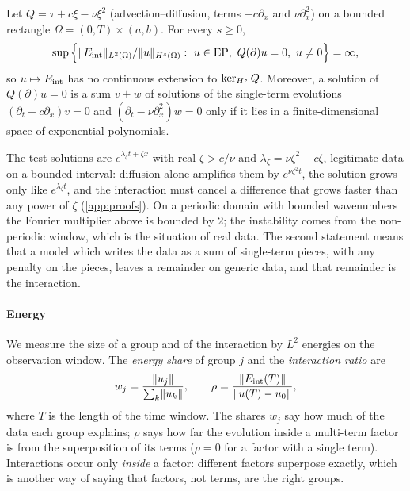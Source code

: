 \begin{proposition}\label{prop:discont}\label{thm:noreg}\label{thm:nocont}
Let $Q=\tau+c\xi-\nu\xi^2$ (advection--diffusion, terms $-c\partial_x$ and $\nu\partial_x^2$) on a bounded
rectangle $\Omega=(0,T)\times(a,b)$. For every $s\ge0$,
\[
  \sup\Big\{\norm{\Eint}_{L^2(\Omega)}/\norm{u}_{\Hs(\Omega)}:\ u\in\EP,\ Q(\partial)u=0,\ u\ne0\Big\}=\infty,
\]
so $u\mapsto E_{\mathrm{int}}$ has no continuous extension to $\ker_{H^{s}}Q$. Moreover, a solution of $Q(\partial)u=0$ is a
sum $v+w$ of solutions of the single-term evolutions $(\partial_t+c\partial_x)v=0$ and $(\partial_t-\nu\partial_x^2)w=0$ only
if it lies in a finite-dimensional space of exponential-polynomials.
\end{proposition}

The test solutions are $e^{\lambda_\zeta t+\zeta x}$ with real $\zeta>c/\nu$ and $\lambda_\zeta=\nu\zeta^2-c\zeta$, legitimate
data on a bounded interval: diffusion alone amplifies them by $e^{\nu\zeta^2t}$, the solution grows only like
$e^{\lambda_\zeta t}$, and the interaction must cancel a difference that grows faster than any power of $\zeta$
(\cref{app:proofs}). On a periodic domain with bounded wavenumbers the Fourier multiplier above is bounded by
$2$; the instability comes from the non-periodic window, which is the situation of real data. The second
statement means that a model which writes the data as a sum of single-term pieces, with any penalty on the
pieces, leaves a remainder on generic data, and that remainder is the interaction.

\paragraph{Energy}
We measure the size of a group and of the interaction by $L^2$ energies on the observation window.
The \emph{energy share} of group $j$ and the \emph{interaction ratio} are
\begin{equation}\label{eq:energy}
  w_j=\frac{\lVert u_j\rVert}{\sum_k\lVert u_k\rVert},\qquad
  \rho=\frac{\lVert E_{\mathrm{int}}(T)\rVert}{\lVert u(T)-u_0\rVert} ,
\end{equation}
where $T$ is the length of the time window. The shares $w_j$ say how much of the data each group
explains; $\rho$ says how far the evolution inside a multi-term factor is from the superposition of its
terms ($\rho=0$ for a factor with a single term). Interactions occur only \emph{inside} a factor:
different factors superpose exactly, which is another way of saying that factors, not terms, are the
right groups.

